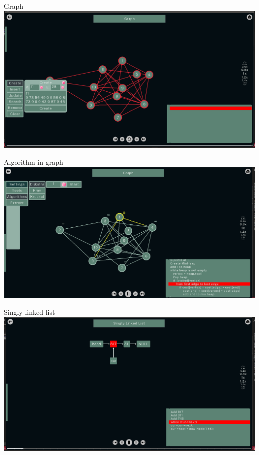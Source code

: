 \begin{center}
    Graph \includegraphics[scale=.35]{img/graph.png} 
    
    Algorithm in graph \includegraphics[scale=.35]{img/algorithm.png} 
    
    Singly linked list \includegraphics[scale=.35]{img/sll.png} 
\end{center}
